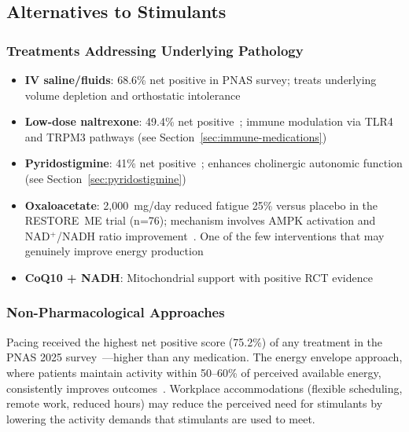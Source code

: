 \subsection{Alternatives to Stimulants}
\label{subsec:stimulant-alternatives}

\subsubsection{Treatments Addressing Underlying Pathology}

\begin{itemize}
    \item \textbf{IV saline/fluids}: 68.6\% net positive in PNAS survey; treats underlying volume depletion and orthostatic intolerance~\cite{Vernon2025PNAS}
    \item \textbf{Low-dose naltrexone}: 49.4\% net positive~\cite{Vernon2025PNAS}; immune modulation via TLR4 and TRPM3 pathways (see Section~\ref{sec:immune-medications})
    \item \textbf{Pyridostigmine}: 41\% net positive~\cite{Vernon2025PNAS}; enhances cholinergic autonomic function (see Section~\ref{sec:pyridostigmine})
    \item \textbf{Oxaloacetate}: 2,000~mg/day reduced fatigue 25\% versus placebo in the RESTORE~ME trial (n=76); mechanism involves AMPK activation and NAD$^+$/NADH ratio improvement~\cite{An2024oxaloacetate}. One of the few interventions that may genuinely improve energy production
    \item \textbf{CoQ10 + NADH}: Mitochondrial support with positive RCT evidence~\cite{Castro2015coq10nadh}
\end{itemize}

\subsubsection{Non-Pharmacological Approaches}

Pacing received the highest net positive score (75.2\%) of any treatment in the PNAS 2025 survey~\cite{Vernon2025PNAS}---higher than any medication. The energy envelope approach, where patients maintain activity within 50--60\% of perceived available energy, consistently improves outcomes~\cite{Jason2008EnergyEnvelope,Jason2013envelope}. Workplace accommodations (flexible scheduling, remote work, reduced hours) may reduce the perceived need for stimulants by lowering the activity demands that stimulants are used to meet.

